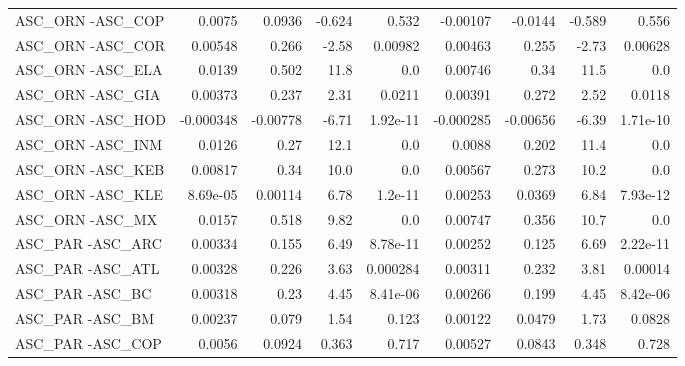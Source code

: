 \begin{tabular}{lrrrrrrrr}
ASC\_ORN -ASC\_COP                        &      0.0075 &       0.0936 &  -0.624 &    0.532 &   -0.00107 &     -0.0144 &       -0.589 &         0.556 \\
ASC\_ORN -ASC\_COR                        &     0.00548 &        0.266 &   -2.58 &  0.00982 &    0.00463 &       0.255 &        -2.73 &       0.00628 \\
ASC\_ORN -ASC\_ELA                        &      0.0139 &        0.502 &    11.8 &      0.0 &    0.00746 &        0.34 &         11.5 &           0.0 \\
ASC\_ORN -ASC\_GIA                        &     0.00373 &        0.237 &    2.31 &   0.0211 &    0.00391 &       0.272 &         2.52 &        0.0118 \\
ASC\_ORN -ASC\_HOD                        &   -0.000348 &     -0.00778 &   -6.71 & 1.92e-11 &  -0.000285 &    -0.00656 &        -6.39 &      1.71e-10 \\
ASC\_ORN -ASC\_INM                        &      0.0126 &         0.27 &    12.1 &      0.0 &     0.0088 &       0.202 &         11.4 &           0.0 \\
ASC\_ORN -ASC\_KEB                        &     0.00817 &         0.34 &    10.0 &      0.0 &    0.00567 &       0.273 &         10.2 &           0.0 \\
ASC\_ORN -ASC\_KLE                        &    8.69e-05 &      0.00114 &    6.78 &  1.2e-11 &    0.00253 &      0.0369 &         6.84 &      7.93e-12 \\
ASC\_ORN -ASC\_MX                         &      0.0157 &        0.518 &    9.82 &      0.0 &    0.00747 &       0.356 &         10.7 &           0.0 \\
ASC\_PAR -ASC\_ARC                        &     0.00334 &        0.155 &    6.49 & 8.78e-11 &    0.00252 &       0.125 &         6.69 &      2.22e-11 \\
ASC\_PAR -ASC\_ATL                        &     0.00328 &        0.226 &    3.63 & 0.000284 &    0.00311 &       0.232 &         3.81 &       0.00014 \\
ASC\_PAR -ASC\_BC                         &     0.00318 &         0.23 &    4.45 & 8.41e-06 &    0.00266 &       0.199 &         4.45 &      8.42e-06 \\
ASC\_PAR -ASC\_BM                         &     0.00237 &        0.079 &    1.54 &    0.123 &    0.00122 &      0.0479 &         1.73 &        0.0828 \\
ASC\_PAR -ASC\_COP                        &      0.0056 &       0.0924 &   0.363 &    0.717 &    0.00527 &      0.0843 &        0.348 &         0.728 \\

\end{tabular}
